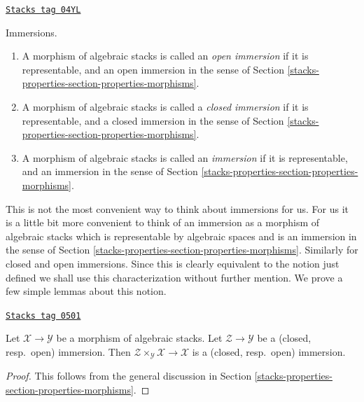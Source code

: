 \begin{definition}[Immersion]
\label{stacks-properties-definition-immersion}
\href{https://stacks.math.columbia.edu/tag/04YL}{\texttt{Stacks tag 04YL}}

Immersions.
\begin{enumerate}
\item A morphism of algebraic stacks is called an {\it open immersion}
if it is representable, and an open immersion
in the sense of
Section \ref{stacks-properties-section-properties-morphisms}.
\item A morphism of algebraic stacks is called a {\it closed immersion}
if it is representable, and a closed immersion
in the sense of
Section \ref{stacks-properties-section-properties-morphisms}.
\item A morphism of algebraic stacks is called an {\it immersion}
if it is representable, and an immersion
in the sense of
Section \ref{stacks-properties-section-properties-morphisms}.
\end{enumerate}
\end{definition}

This is not the most convenient way to think about immersions for us.
For us it is a little bit more convenient to think of an immersion
as a morphism of algebraic stacks which is representable by algebraic
spaces and is an immersion in the sense of
Section \ref{stacks-properties-section-properties-morphisms}.
Similarly for closed and open immersions.
Since this is clearly equivalent to the notion just defined we shall
use this characterization without further mention.
We prove a few simple lemmas about this notion.

\begin{lemma}
\label{stacks-properties-lemma-base-change-immersion}
\href{https://stacks.math.columbia.edu/tag/0501}{\texttt{Stacks tag 0501}}

Let $\mathcal{X} \to \mathcal{Y}$ be a morphism of algebraic stacks.
Let $\mathcal{Z} \to \mathcal{Y}$ be a
(closed, resp.\ open) immersion.
Then $\mathcal{Z} \times_\mathcal{Y} \mathcal{X} \to \mathcal{X}$
is a (closed, resp.\ open) immersion.
\end{lemma}

\begin{proof}
This follows from the general discussion in
Section \ref{stacks-properties-section-properties-morphisms}.
\end{proof}

